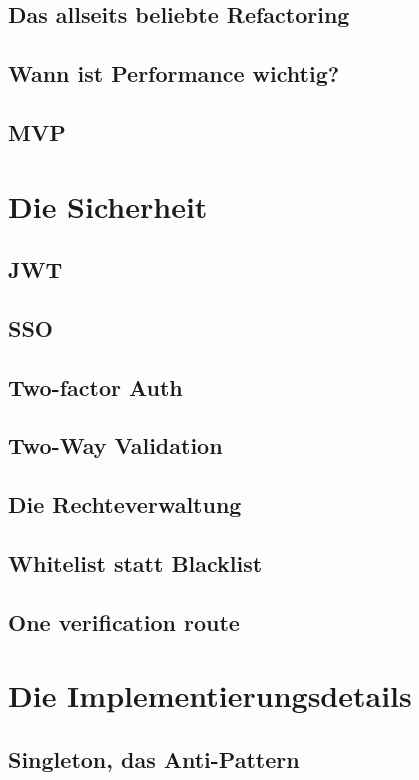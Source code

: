 \section{Das allseits beliebte Refactoring}

\section{Wann ist Performance wichtig?}

\section{MVP}

\chapter{Die Sicherheit}
\section{JWT}
\section{SSO}
\section{Two-factor Auth}
\section{Two-Way Validation}
\section{Die Rechteverwaltung}
\section{Whitelist statt Blacklist}
\section{One verification route}

\chapter{Die Implementierungsdetails}

\section{Singleton, das Anti-Pattern}
